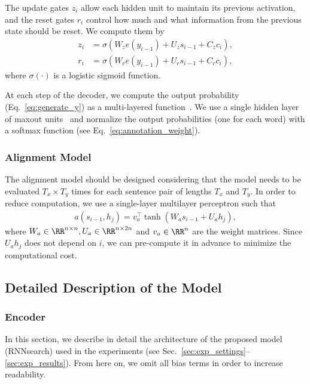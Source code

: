 The update gates $z_i$ allow each hidden unit to maintain its previous
activation, and the reset gates $r_i$ control how much and what information from
the previous state should be reset. We compute them by
\begin{align*}
    z_i &= \sigma \left( W_{z} e(y_{i - 1}) + U_{z} s_{i - 1} + C_{z} c_i\right), \\
    r_i &= \sigma \left( W_{r} e(y_{i - 1}) + U_{r} s_{i - 1} + C_{r} c_i\right),
\end{align*}
where $\sigma\left(\cdot\right)$ is a logistic sigmoid function.

At each step of the decoder, we compute the output probability
(Eq.~\eqref{eq:generate_y}) as a multi-layered function~\citep{Pascanu2014rec}.
We use a single hidden layer of maxout units~\citep{Goodfellow2013} and
normalize the output probabilities (one for each word) with a softmax function
(see Eq.~\eqref{eq:annotation_weight}).

\subsubsection{Alignment Model}

The alignment model should be designed considering that the model needs to be
evaluated $T_x \times T_y$ times for each sentence pair of lengths $T_x$ and
$T_y$. In order to reduce computation, we use a single-layer multilayer
perceptron such that 
\begin{align*}
    a(s_{i-1}, h_j) = v_a^{\top} \tanh\left( W_a s_{i-1} + U_a h_j \right),
\end{align*}
where $W_a \in \RR^{n\times n}, U_a \in \RR^{n\times 2n}$ and $v_a \in \RR^{n}$
are the weight matrices. Since $U_a h_j$ does not depend on $i$, we can
pre-compute it in advance to minimize the computational cost. 


\subsection{Detailed Description of the Model}
\subsubsection{Encoder}

In this section, we describe in detail the architecture of the proposed model
(RNNsearch) used in the experiments (see
Sec.~\ref{sec:exp_settings}--\ref{sec:exp_results}).  From here on, we omit all
bias terms in order to increase readability.

